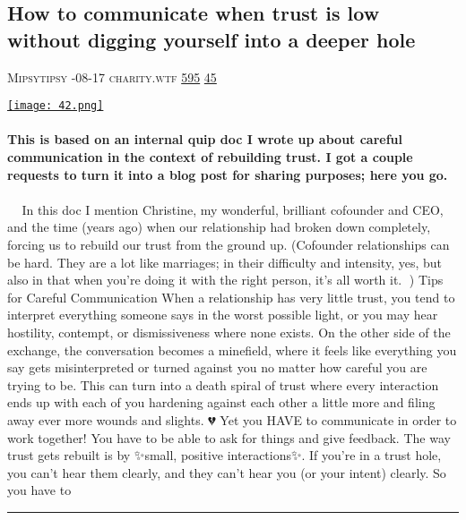 \documentclass[10pt,a4paper]{article}
\begin{document}
\begin{multicols*}{2}
\begin{minipage}{\linewidth}
\subsection{How to communicate when trust is low without digging yourself into a deeper hole}
\textsc{\footnotesize
{\scriptsize\faUser}\space 
Mipsytipsy 
{\scriptsize\faCalendar}-08-17 
{\scriptsize\faGlobe}\space 
charity.wtf 
{\scriptsize\faThumbsOUp}\space 
\href{http://news.ycombinator.com/item?id=37166946\&utm\_term=comment}{595} 
{\scriptsize\faComments}\space 
\href{http://news.ycombinator.com/item?id=37166946\&utm\_term=comment}{45} 
}
\par\medskip\noindent
\href{https://charity.wtf/2023/08/17/how-to-communicate-when-trust-is-low-without-digging-yourself-into-a-deeper-hole/?utm\_source=hackernewsletter\&utm\_medium=email\&utm\_term=working}{
    \texttt{[image: 42.png]}
}
\end{minipage}
\paragraph{}
\textbf{This is based on an internal quip doc I wrote up about careful communication in the context of rebuilding trust. I got a couple requests to turn it into a blog post for sharing purposes; here you go.}
\paragraph{}
🌈✨🥂
In this doc I mention Christine, my wonderful, brilliant cofounder and CEO, and the time (years ago) when our relationship had broken down completely, forcing us to rebuild our trust from the ground up.
(Cofounder relationships can be hard. They are a lot like marriages; in their difficulty and intensity, yes, but also in that when you’re doing it with the right person, it’s all worth it. 💜)
Tips for Careful Communication
When a relationship has very little trust, you tend to interpret everything someone says in the worst possible light, or you may hear hostility, contempt, or dismissiveness where none exists. On the other side of the exchange, the conversation becomes a minefield, where it feels like everything you say gets misinterpreted or turned against you no matter how careful you are trying to be. This can turn into a death spiral of trust where every interaction ends up with each of you hardening against each other a little more and filing away ever more wounds and slights. 💔
Yet you HAVE to communicate in order to work together! You have to be able to ask for things and give feedback.
The way trust gets rebuilt is by ✨small, positive interactions✨. If you’re in a trust hole, you can’t hear them clearly, and they can’t hear you (or your intent) clearly. So you have to 
\par\noindent\textcolor{red}{\rule{\linewidth}{0.2mm}}
\vfill
\null
\noindent\begin{minipage}{\linewidth}

\end{minipage}
\end{multicols*}
\end{document}
